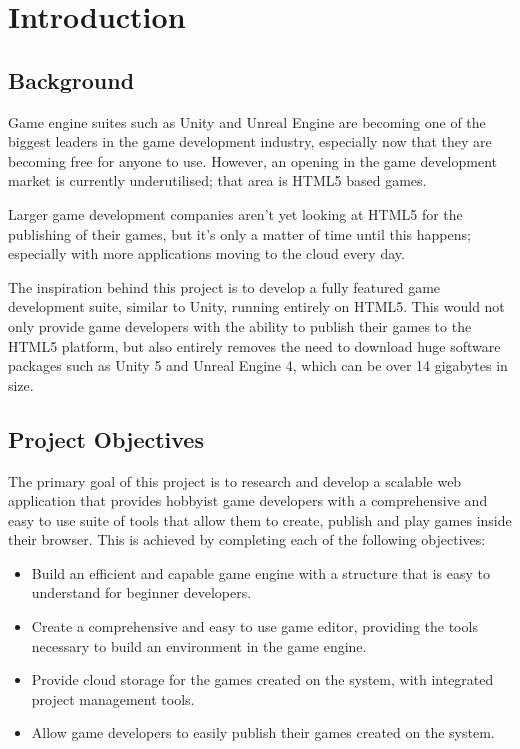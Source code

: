 \chapter{Introduction}
\section{Background}
Game engine suites such as Unity and Unreal Engine are becoming one of the biggest leaders in the game development industry, especially now that they are becoming free for anyone to use.\cite{ue4free} However, an opening in the game development market is currently underutilised; that area is HTML5 based games.

Larger game development companies aren't yet looking at HTML5 for the publishing of their games, but it's only a matter of time until this happens; especially with more applications moving to the cloud every day.\cite{5936687}

The inspiration behind this project is to develop a fully featured game development suite, similar to Unity, running entirely on HTML5. This would not only provide game developers with the ability to publish their games to the HTML5 platform, but also entirely removes the need to download huge software packages such as Unity 5 and Unreal Engine 4, which can be over 14 gigabytes in size.

\section{Project Objectives}
The primary goal of this project is to research and develop a scalable web application that provides hobbyist game developers with a comprehensive and easy to use suite of tools that allow them to create, publish and play games inside their browser. This is achieved by completing each of the following objectives:

\begin{itemize}
	\item Build an efficient and capable game engine with a structure that is easy to understand for beginner developers.
	\item Create a comprehensive and easy to use game editor, providing the tools necessary to build an environment in the game engine.
	\item Provide cloud storage for the games created on the system, with integrated project management tools.
	\item Allow game developers to easily publish their games created on the system.
\end{itemize}

